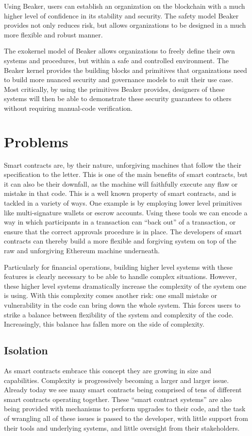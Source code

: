 \documentclass[english,a4paper]{article}
\begin{document}
Using Beaker, users can establish an organization on the blockchain with
a much higher level of confidence in its stability and security. The
safety model Beaker provides not only reduces risk, but allows
organizations to be designed in a much more flexible and robust manner.

The exokernel model of Beaker allows organizations to freely define
their own systems and procedures, but within a safe and controlled
environment. The Beaker kernel provides the building blocks and
primitives that organizations need to build more nuanced security and governance
models to suit their use case. Most critically, by using the primitives
Beaker provides, designers of these systems will then be able to
demonstrate these security guarantees to others without requiring manual-code verification.

\section{Problems}\label{problems}
Smart contracts are, by their nature, unforgiving machines that follow the their
specification to the letter. This is one of the main benefits of smart
contracts, but it can also be their downfall, as the machine will faithfully
execute any flaw or mistake in that code. This is a well known property of smart
contracts, and is tackled in a variety of ways. One example is by employing
lower level primitives like multi-signature wallets or escrow accounts. Using
these tools we can encode a way in which participants in a transaction can
``back out'' of a transaction, or ensure that the correct approvals procedure is
in place. The developers of smart contracts can thereby build a more flexible
and forgiving system on top of the raw and unforgiving Ethereum machine
underneath.

Particularly for financial operations, building higher level systems with
these features is clearly necessary to be able to handle complex situations.
However, these higher level systems dramatically increase the complexity of the
system one is using. With this complexity comes another risk: one small mistake
or vulnerability in the code can bring down the whole system. This forces users
to strike a balance between flexibility of the system and complexity of the
code. Increasingly, this balance has fallen more on the side of complexity.

\subsection{Isolation}\label{isolation}
As smart contracts embrace this concept they are growing in size and
capabilities. Complexity is
progressively becoming a larger and larger issue. Already today we see many
smart
contracts being comprised of tens of different smart contracts operating
together. These ``smart contract systems'' are also being provided with
mechanisms to perform upgrades to their code, and the task of wrangling all of
these issues is
passed to the developer, with little support from their tools and underlying
systems, and little oversight from their stakeholders.
\end{document}
